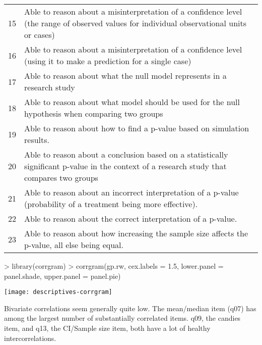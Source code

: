 \documentclass[11pt]{article}
\begin{document}
\begin{center}
\begin{tabular}{rl}
15 & Able to reason about a misinterpretation of a confidence level (the range of observed values for individual observational units or cases)\\
16 & Able to reason about a misinterpretation of a confidence level (using it to make a prediction for a single case)\\
17 & Able to reason about what the null model represents in a research study\\
18 & Able to reason about what model should be used for the null hypothesis when comparing two groups\\
19 & Able to reason about how to find a p-value based on simulation results.\\
20 & Able to reason about a conclusion based on a statistically significant p-value in the context of a research study that compares two groups\\
21 & Able to reason about an incorrect interpretation of a p-value (probability of a treatment being more effective).\\
22 & Able to reason about the correct interpretation of a p-value.\\
23 & Able to reason about how increasing the sample size affects the p-value, all else being equal.\\
\end{tabular}
\end{center}

\begin{Schunk}
\begin{Sinput}
> library(corrgram)
> corrgram(gp.rw, cex.labels = 1.5, lower.panel = panel.shade, upper.panel = panel.pie)
\end{Sinput}
\end{Schunk}
\texttt{[image: descriptives-corrgram]}

Bivariate correlations seem generally quite low.  The mean/median item (q07) has among the largest number of substantially correlated items.  q09, the candies item, and q13, the CI/Sample size item, both have a lot of healthy intercorrelations.
\end{document}

